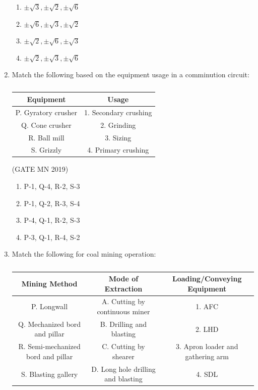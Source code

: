 \documentclass[journal]{IEEEtran}
\begin{document}
\begin{enumerate}
\begin{multicols}{2}
\begin{enumerate}
  \item $\pm \sqrt{3}, \pm \sqrt{2}, \pm \sqrt{6}$
  \item $\pm \sqrt{6}, \pm \sqrt{3}, \pm \sqrt{2}$
  \item $\pm \sqrt{2}, \pm \sqrt{6}, \pm \sqrt{3}$
  \item $\pm \sqrt{2}, \pm \sqrt{3}, \pm \sqrt{6}$
\end{enumerate}
\end{multicols}

\item Match the following based on the equipment usage in a comminution circuit:



  \begin{table}[H]
    \centering\normalsize
\begin{tabular}{|c|c|}
\hline
\textbf{Equipment} & \textbf{Usage} \\ \hline
P. Gyratory crusher & 1. Secondary crushing \\ \hline
Q. Cone crusher     & 2. Grinding \\ \hline
R. Ball mill        & 3. Sizing \\ \hline
S. Grizzly          & 4. Primary crushing \\ \hline
\end{tabular}
\caption{}
    \label{tab:Q39}
\end{table}


\hfill(GATE MN 2019)
\begin{multicols}{2}
\begin{enumerate}
  \item P-1, Q-4, R-2, S-3  
  \item P-1, Q-2, R-3, S-4  
  \item P-4, Q-1, R-2, S-3  
  \item P-3, Q-1, R-4, S-2  
\end{enumerate}
\end{multicols}


\item Match the following for coal mining operation:

  \begin{table}[H]
    \centering\tiny

\begin{tabular}{|c|c|c|}
\hline
\textbf{Mining Method} & \textbf{Mode of Extraction} & \textbf{Loading/Conveying Equipment} \\ \hline
P. Longwall & A. Cutting by continuous miner & 1. AFC \\ \hline
Q. Mechanized bord and pillar & B. Drilling and blasting & 2. LHD \\ \hline
R. Semi-mechanized bord and pillar & C. Cutting by shearer & 3. Apron loader and gathering arm \\ \hline
S. Blasting gallery & D. Long hole drilling and blasting & 4. SDL \\ \hline
\end{tabular}
\caption{}
    \label{tab:Q40}
\end{table}



\end{enumerate}
\end{document}
